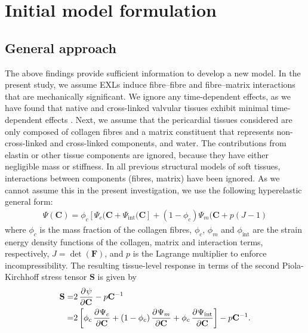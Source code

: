 \section{Initial model formulation}

\subsection{General approach}

    The above findings provide sufficient information to develop a new model. In the present study, we assume EXLs induce fibre–fibre and fibre–matrix interactions that are mechanically significant. We ignore any time-dependent effects, as we have found that native and cross-linked valvular tissues exhibit minimal time-dependent effects \cite{grashow_planar_2006,grashow_biaxial_2006,stella_time_2007,eckert_biomechanical_2013}. Next, we assume that the pericardial tissues considered are only composed of collagen fibres and a matrix constituent that represents non-cross-linked and cross-linked components, and water. The contributions from elastin or other tissue components are ignored, because they have either negligible mass or stiffness. In all previous structural models of soft tissues, interactions between components (fibres, matrix) have been ignored. As we cannot assume this in the present investigation, we use the following hyperelastic general form:
        \begin{equation}\label{c3:eqn:41}
        \begin{aligned}
        \Psi(\mathbf{C}) = \phi_c[\Psi_c(\mathbf{C} +\Psi_\mathrm{int}(\mathbf{C}] + (1-\phi_c)\Psi_m(\mathbf{C} + p(J-1)
        \end{aligned}
        \end{equation}
    where $\phi_c$ is the mass fraction of the collagen fibres, $\phi_c$, $\phi_m$ and $\phi_\mathrm{int}$ are the strain energy density functions of the collagen, matrix and interaction terms, respectively, $J=\operatorname{det}(\mathbf{F})$, and $p$ is the Lagrange multiplier to enforce incompressibility. The resulting tissue-level response in terms of the second Piola-Kirchhoff stress tensor $\mathbf{S}$ is given by
        \begin{equation}\label{c3:eqn:42}
        \begin{aligned}
        \mathbf{S} =& 2\dpd{\psi}{\mathbf{C}} - p\mathbf{C}^{-1} \\
            =& 2\left[\phi_c\dpd{\Psi_c}{\mathbf{C}} + (1-\phi_c) \dpd{\Psi_m}{\mathbf{C}} + \phi_c \dpd{\Psi_\mathrm{int}}{\mathbf{C}}\right] - p\mathbf{C}^{-1}.
        \end{aligned}
        \end{equation}
        



